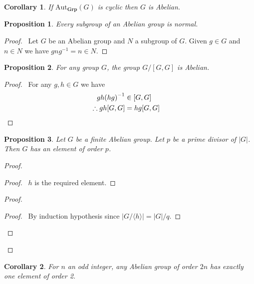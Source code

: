 \documentclass{book}
\let\qed\relax
\newtheorem{prop}{Proposition}[chapter]
\newtheorem{cor}{Corollary}[prop]
\theoremstyle{definition}
\newcommand{\Aut}[2]{\ensuremath{\mathrm{Aut}_{#1} \left( {#2} \right)}}
\newcommand{\Grp}{\ensuremath{\mathbf{Grp}}}
\newcommand{\inv}[1]{\ensuremath{{#1}^{-1}}}
\begin{document}
\begin{cor}
If $\Aut{\Grp}{G}$ is cyclic then $G$ is Abelian.
\end{cor}

\begin{prop}
Every subgroup of an Abelian group is normal.
\end{prop}

\begin{proof}
\pf\ Let $G$ be an Abelian group and $N$ a subgroup of $G$. Given $g \in G$ and $n \in N$ we have $gn\inv{g} = n \in N$. \qed
\end{proof}

\begin{prop}
For any group $G$, the group $G / [G,G]$ is Abelian.
\end{prop}

\begin{proof}
\pf\ For any $g,h \in G$ we have
\begin{align*}
gh\inv{(hg)} & \in [G,G] \\
\therefore gh[G,G] & = hg[G,G] & \qed
\end{align*}
\end{proof}

\begin{prop}
Let $G$ be a finite Abelian group. Let $p$ be a prime divisor of $|G|$. Then $G$ has an element of order $p$.
\end{prop}

\begin{proof}
\pf
{}
\begin{proof}
\pf\ $h$ is the required element.
\end{proof}
\begin{proof}
\begin{proof}
\pf\ By induction hypothesis since $|G / \langle h \rangle| = |G| / q$.
\end{proof}
\end{proof}
\qed
\end{proof}

\begin{cor}
For $n$ an odd integer, any Abelian group of order $2n$ has exactly one element of order 2.
\end{cor}
\end{document}

